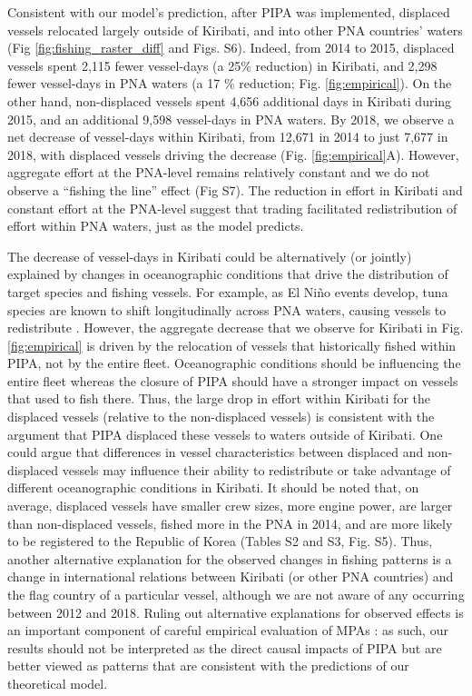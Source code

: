 \documentclass[12pt]{article}
\begin{document}
Consistent with our model's prediction, after PIPA was implemented, displaced vessels relocated largely outside of Kiribati, and into other PNA countries' waters (Fig \ref{fig:fishing_raster_diff} and Figs. S6). Indeed, from 2014 to 2015, displaced vessels spent 2,115 fewer vessel-days (a 25\% reduction) in Kiribati, and 2,298 fewer vessel-days in PNA waters (a 17 \% reduction; Fig. \ref{fig:empirical}). On the other hand, non-displaced vessels spent 4,656 additional days in Kiribati during 2015, and an additional 9,598 vessel-days in PNA waters. By 2018, we observe a net decrease of vessel-days within Kiribati, from 12,671 in 2014 to just 7,677 in 2018, with displaced vessels driving the decrease (Fig. \ref{fig:empirical}A). However, aggregate effort at the PNA-level remains relatively constant and we do not observe a ``fishing the line'' effect (Fig S7). The reduction in effort in Kiribati and constant effort at the PNA-level suggest that trading facilitated redistribution of effort within PNA waters, just as the model predicts.

The decrease of vessel-days in Kiribati could be alternatively (or jointly) explained by changes in oceanographic conditions that drive the distribution of target species and fishing vessels. For example, as El Ni\~no events develop, tuna species are known to shift longitudinally across PNA waters, causing vessels to redistribute \cite{aqorau_2018,hanich2018unraveling}. However, the aggregate decrease that we observe for Kiribati in Fig. \ref{fig:empirical} is driven by the relocation of vessels that historically fished within PIPA, not by the entire fleet. Oceanographic conditions should be influencing the entire fleet whereas the closure of PIPA should have a stronger impact on vessels that used to fish there. Thus, the large drop in effort within Kiribati for the displaced vessels (relative to the non-displaced vessels) is consistent with the argument that PIPA displaced these vessels to waters outside of Kiribati. One could argue that differences in vessel characteristics between displaced and non-displaced vessels may influence their ability to redistribute or take advantage of different oceanographic conditions in Kiribati. It should be noted that, on average, displaced vessels have smaller crew sizes, more engine power, are larger than non-displaced vessels, fished more in the PNA in 2014, and are more likely to be registered to the Republic of Korea (Tables S2 and S3, Fig. S5). Thus, another alternative explanation for the observed changes in fishing patterns is a change in international relations between Kiribati (or other PNA countries) and the flag country of a particular vessel, although we are not aware of any occurring between 2012 and 2018. Ruling out alternative explanations for observed effects is an important component of careful empirical evaluation of MPAs \cite{ferraro2018causal}: as such, our results should not be interpreted as the direct causal impacts of PIPA but are better viewed as patterns that are consistent with the predictions of our theoretical model.
\end{document}
